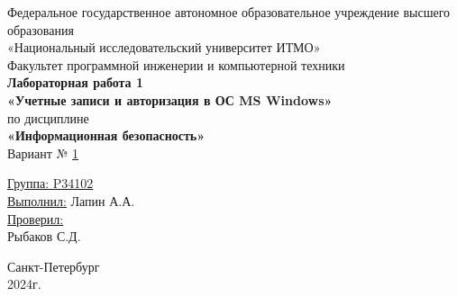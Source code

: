 \documentclass[a4paper, 14pt]{report}
\begin{document}
\newcommand{\nchapter}[1]{%
    \chapter*{#1} %
    \addcontentsline{toc}{chapter}{#1} %
}
\newcommand{\nsubsection}[1]{%
    \subsection*{#1} %
    \addcontentsline{toc}{subsection}{#1} %
}
\makeatletter

\renewcommand{\tableofcontents}{%
    \chapter*{\contentsname}%
    \addcontentsline{toc}{chapter}{\contentsname}%
    \@starttoc{toc}%
}
\makeatother

\begin{titlepage}
    \centering
    {\large Федеральное государственное автономное образовательное учреждение высшего образования}\\
    {\large «Национальный исследовательский университет ИТМО»}\\[0.5cm]

    {\large Факультет программной инженерии и компьютерной техники}\\[3cm]

    {\large \bfseries Лабораторная работа 1}\\[0.5cm]
    {\large \bfseries «Учетные записи и авторизация в ОС MS Windows»}\\[0.5cm]
    {\large по дисциплине}\\[0.5cm]
    {\large \bfseries «Информационная безопасность»}\\[1cm]

    {\large Вариант № \underline{1}}\\[5cm]
    \begin{flushright}
        {\large \underline{Группа: P34102}}\\[0.5cm]
        {\large \underline{Выполнил:} Лапин А.А.}\\[1cm]

        {\large \underline{Проверил:}}\\
        {\large Рыбаков С.Д.}\\[7cm]
    \end{flushright}

    {\large Санкт-Петербург}\\
    {\large 2024г.}
\end{titlepage}
\end{document}
